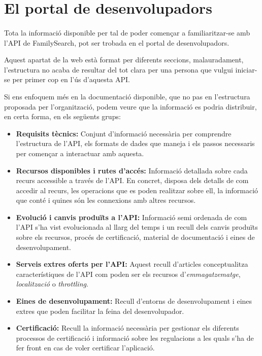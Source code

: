 \section{El portal de desenvolupadors}

    \paragraph{}
    Tota la informació disponible per tal de poder començar a familiaritzar-se amb l’\gls{API} de FamilySearch, pot ser trobada en el portal de desenvolupadors.

    Aquest apartat de la web està format per diferents seccions, malauradament, l’estructura no acaba de resultar del tot clara per una persona que vulgui iniciar-se per primer cop en l'ús d'aquesta \gls{API}.

    Si ens enfoquem més en la documentació disponible, que no pas en l'estructura proposada per l’organització, podem veure que la informació es podria distribuir, en certa forma, en els següents grups:

    \begin{itemize}
        \item \textbf{Requisits tècnics:} Conjunt d’informació necessària per comprendre l’estructura de l'\gls{API}, els formats de dades que maneja i els passos necessaris per començar a interactuar amb aquesta.
        \item \textbf{Recursos disponibles i rutes d’accés:} Informació detallada sobre cada recurs accessible a través de l'\gls{API}. En concret, disposa dels detalls de com accedir al recurs, les operacions que es poden realitzar sobre ell, la informació que conté i quines són les connexions amb altres recursos.
        \item \textbf{Evolució i canvis produïts a l'\gls{API}:} Informació semi ordenada de com l'\gls{API} s’ha vist evolucionada al llarg del temps i un recull dels canvis produïts sobre els recursos, procés de certificació, material de documentació i eines de desenvolupament.
        \item \textbf{Serveis extres oferts per l'\gls{API}:} Aquest recull d’articles conceptualitza característiques de l'\gls{API} com poden ser els recursos d'\emph{emmagatzematge}, \emph{localització} o \emph{throttling}.
        \item \textbf{Eines de desenvolupament:} Recull d’entorns de desenvolupament i eines extres que poden facilitar la feina del desenvolupador.
        \item \textbf{Certificació:} Recull la informació necessària per gestionar els diferents processos de certificació i informació sobre les regulacions a les quals s'ha de fer front en cas de voler certificar l'aplicació.
    \end{itemize}
